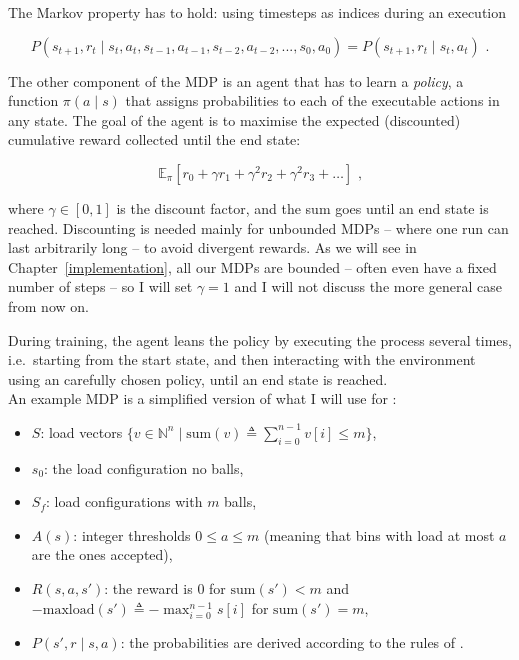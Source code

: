 The Markov property has to hold: using timesteps as indices during an execution

\begin{equation} \label{eq:MarkovProperty}
P(s_{t+1},r_{t} \mid s_{t}, a_{t}, s_{t-1}, a_{t-1}, s_{t-2}, a_{t-2}, ..., s_{0}, a_{0}) = P(s_{t+1},r_{t} \mid s_{t}, a_{t})\text{ .}
\end{equation}


The other component of the MDP is an agent that has to learn a \textit{policy}, a function $\pi(a\mid s)$ that assigns probabilities to each of the executable actions in any state. The goal of the agent is to maximise the expected (discounted) cumulative reward collected until the end state:

\begin{equation}\label{eq:cumReward}
\mathbb{E}_{\pi}[r_{0} + \gamma r_{1} + \gamma^2 r_{2} + \gamma^2 r_{3} + \ldots]\text{ ,}
\end{equation}

where $\gamma \in [0, 1]$ is the discount factor, and the sum goes until an end state is reached. Discounting is needed mainly for unbounded MDPs -- where one run can last arbitrarily long -- to avoid divergent rewards. As we will see in Chapter~\ref{implementation}, all our MDPs are bounded -- often even have a fixed number of steps -- so I will set $\gamma=1$ and I will not discuss the more general case from now on.


During training, the agent leans the policy by executing the process several times, i.e.\ starting from the start state, and then interacting with the environment using an carefully chosen policy, until an end state is reached.\\

An example MDP is a simplified version of what I will use for \TwoThinning:

\begin{itemize}[itemsep=0pt]
    \item 
    $S$: load vectors $\{v\in \mathbb{N}^n\mid\mathrm{sum}(v)\triangleq \sum_{i=0}^{n-1}v[i]\leq m\}$,
    \item
    $s_0$: the load configuration no balls,
    \item
    $S_f$: load configurations with $m$ balls,
    \item
    $A(s)$: integer thresholds $0\leq a\leq m$ (meaning that bins with load at most $a$ are the ones accepted),
    \item
    $R(s, a, s')$: the reward is $0$ for $\mathrm{sum}(s')<m$ and $-\mathrm{maxload}(s')\triangleq -\max_{i=0}^{n-1} s[i]$ for $\mathrm{sum}(s')=m$,
    \item
    $P(s', r \mid s, a)$: the probabilities are derived according to the rules of \TwoThinning.
\end{itemize}


